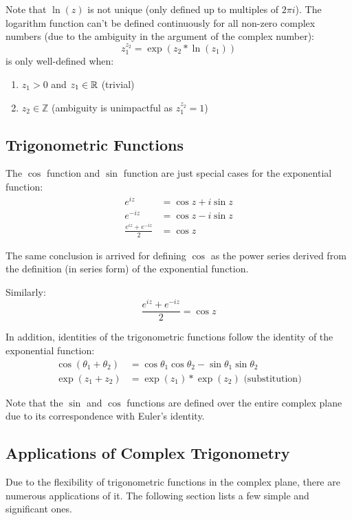 \documentclass[12pt]{article}
\begin{document}
	Note that $\ln(z)$ is not unique (only defined up to multiples of $2\pi i$). The logarithm function can't be defined continuously for all non-zero complex numbers (due to the ambiguity in the argument of the complex number):
	$$z_1^{z_2} = \exp(z_2 * \ln(z_1))$$
	is only well-defined when:
	\begin{enumerate}
		\item $z_1 > 0$ and $z_1 \in \mathbb{R}$ (trivial)
		\item $z_2 \in \mathbb{Z}$ (ambiguity is unimpactful as $z_1^{z_2} = 1$)
	\end{enumerate}
	
	\subsection{Trigonometric Functions}
	
	The $\cos$ function and $\sin$ function are just special cases for the exponential function:
	\begin{align*}
		e^{iz} &= \cos z + i\sin z \\
		e^{-iz} &= \cos z - i\sin z \\
		\frac{e^{iz} + e^{-iz}}{2} &= \cos z
	\end{align*}
	
	The same conclusion is arrived for defining $\cos$ as the power series derived from the definition (in series form) of the exponential function.
	
	Similarly: $$\frac{e^{iz} + e^{-iz}}{2} = \cos z$$
	
	In addition, identities of the trigonometric functions follow the identity of the exponential function:
	\begin{align*}
		\cos(\theta_1 + \theta_2) &= \cos \theta_1 \cos \theta_2 - \sin \theta_1 \sin \theta_2 \\
		\exp(z_1 + z_2) &= \exp(z_1) * \exp(z_2) \text{ (substitution)}
	\end{align*}
	
	Note that the $\sin$ and $\cos$ functions are defined over the entire complex plane due to its correspondence with Euler's identity.
	
	\subsection{Applications of Complex Trigonometry}
	
	Due to the flexibility of trigonometric functions in the complex plane, there are numerous applications of it. The following section lists a few simple and significant ones.
	
\end{document}
